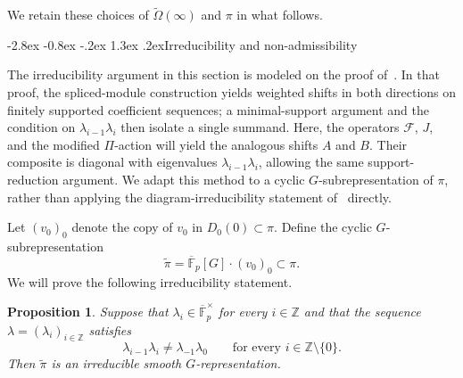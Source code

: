 \documentclass[10pt]{article}
\makeatletter
\renewcommand\section{\@startsection{section}{1}{\z@}%
  {-2.8ex \@plus -0.8ex \@minus -.2ex}%
  {1.3ex \@plus .2ex}{\normalfont\Large\bfseries}}
\theoremstyle{plain}
\newtheorem{proposition}[theorem]{Proposition}
\theoremstyle{definition}
\theoremstyle{remark}
\newcommand{\Fpbar}{\overline{\mathbb{F}}_p}
\makeatother
\begin{document}
We retain these choices of $\widetilde\Omega(\infty)$ and $\pi$ in what follows.

\section{Irreducibility and non-admissibility}\label{sec:irreducibility}

The irreducibility argument in this section is modeled on the proof of~\cite[Proposition~3.1]{GLS23}. In that proof, the spliced-module construction yields weighted shifts in both directions on finitely supported coefficient sequences; a minimal-support argument and the condition on $\lambda_{i-1}\lambda_i$ then isolate a single summand. Here, the operators $\mathcal F$, $J$, and the modified $\Pi$-action will yield the analogous shifts $A$ and $B$. Their composite is diagonal with eigenvalues $\lambda_{i-1}\lambda_i$, allowing the same support-reduction argument. We adapt this method to a cyclic $G$-subrepresentation of $\pi$, rather than applying the diagram-irreducibility statement of~\cite[Proposition~3.1]{GLS23} directly.

Let $(v_0)_0$ denote the copy of $v_0$ in $D_0(0)\subset\pi$. Define the cyclic $G$-subrepresentation
\begin{equation}\label{eq:tilde-pi-definition}
\widetilde\pi=\Fpbar[G]\cdot(v_0)_0\subset\pi.
\end{equation}
We will prove the following irreducibility statement.

\begin{proposition}\label{prop:tilde-pi-irreducible}
Suppose that $\lambda_i\in\Fpbar^\times$ for every $i\in\mathbb{Z}$ and that the sequence $\lambda=(\lambda_i)_{i\in\mathbb{Z}}$ satisfies
\begin{equation}\label{eq:lambda-irreducibility-condition}
\lambda_{i-1}\lambda_i\ne\lambda_{-1}\lambda_0
\qquad\text{for every }i\in\mathbb{Z}\setminus\{0\}.
\end{equation}
Then $\widetilde\pi$ is an irreducible smooth $G$-representation.
\end{proposition}
\end{document}
